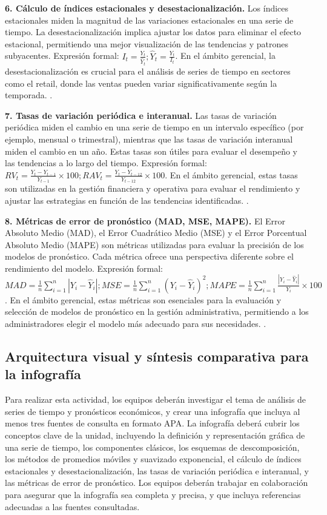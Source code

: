 {\textbf{6. Cálculo de índices estacionales y desestacionalización.} Los índices estacionales miden la magnitud de las variaciones estacionales en una serie de tiempo. La desestacionalización implica ajustar los datos para eliminar el efecto estacional, permitiendo una mejor visualización de las tendencias y patrones subyacentes. Expresión formal: $I_t = \frac{Y_t}{\hat{Y}_t}; \hat{Y}_t = \frac{Y_t}{I_t}$. En el ámbito gerencial, la desestacionalización es crucial para el análisis de series de tiempo en sectores como el retail, donde las ventas pueden variar significativamente según la temporada. \citep{anderson2012,lind2012,wackerly2010}.

\textbf{7. Tasas de variación periódica e interanual.} Las tasas de variación periódica miden el cambio en una serie de tiempo en un intervalo específico (por ejemplo, mensual o trimestral), mientras que las tasas de variación interanual miden el cambio en un año. Estas tasas son útiles para evaluar el desempeño y las tendencias a lo largo del tiempo. Expresión formal: $RV_t = \frac{Y_t - Y_{t-1}}{Y_{t-1}} \times 100; RAV_t = \frac{Y_t - Y_{t-12}}{Y_{t-12}} \times 100$. En el ámbito gerencial, estas tasas son utilizadas en la gestión financiera y operativa para evaluar el rendimiento y ajustar las estrategias en función de las tendencias identificadas. \citep{anderson2012,lind2012,wackerly2010}.

\textbf{8. Métricas de error de pronóstico (MAD, MSE, MAPE).} El Error Absoluto Medio (MAD), el Error Cuadrático Medio (MSE) y el Error Porcentual Absoluto Medio (MAPE) son métricas utilizadas para evaluar la precisión de los modelos de pronóstico. Cada métrica ofrece una perspectiva diferente sobre el rendimiento del modelo. Expresión formal: $MAD = \frac{1}{n}\sum_{i=1}^{n} |Y_i - \hat{Y}_i|; MSE = \frac{1}{n}\sum_{i=1}^{n} (Y_i - \hat{Y}_i)^2; MAPE = \frac{1}{n}\sum_{i=1}^{n} \frac{|Y_i - \hat{Y}_i|}{Y_i} \times 100$. En el ámbito gerencial, estas métricas son esenciales para la evaluación y selección de modelos de pronóstico en la gestión administrativa, permitiendo a los administradores elegir el modelo más adecuado para sus necesidades. \citep{anderson2012,lind2012,wackerly2010}.


\subsection{Arquitectura visual y síntesis comparativa para la infografía}
Para realizar esta actividad, los equipos deberán investigar el tema de análisis de series de tiempo y pronósticos económicos, y crear una infografía que incluya al menos tres fuentes de consulta en formato APA. La infografía deberá cubrir los conceptos clave de la unidad, incluyendo la definición y representación gráfica de una serie de tiempo, los componentes clásicos, los esquemas de descomposición, los métodos de promedios móviles y suavizado exponencial, el cálculo de índices estacionales y desestacionalización, las tasas de variación periódica e interanual, y las métricas de error de pronóstico. Los equipos deberán trabajar en colaboración para asegurar que la infografía sea completa y precisa, y que incluya referencias adecuadas a las fuentes consultadas.

}
